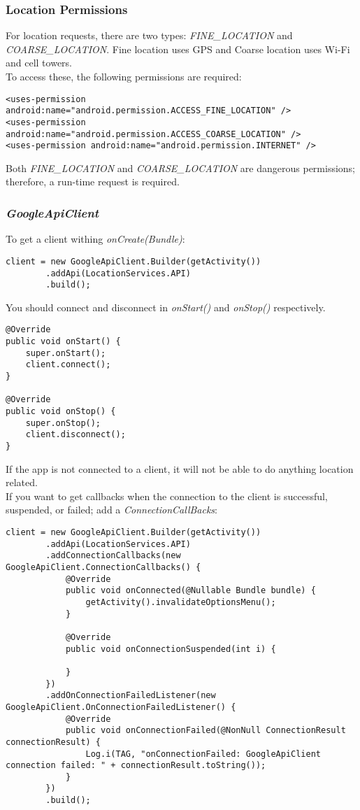 \documentclass[]{article}
\renewcommand{\it}[1]{\textit{#1}}
\begin{document}
\subsubsection{Location Permissions}
For location requests, there are two types: \it{FINE\_LOCATION} and \it{COARSE\_LOCATION}. 
Fine location uses GPS and Coarse location uses Wi-Fi and cell towers.
\\
To access these, the following permissions are required:
\begin{lstlisting}
<uses-permission android:name="android.permission.ACCESS_FINE_LOCATION" />
<uses-permission android:name="android.permission.ACCESS_COARSE_LOCATION" />
<uses-permission android:name="android.permission.INTERNET" />
\end{lstlisting}
Both \it{FINE\_LOCATION} and \it{COARSE\_LOCATION} are dangerous permissions; therefore, a run-time request is required.

\subsubsection{\it{GoogleApiClient}}
To get a client withing \it{onCreate(Bundle)}:
\begin{lstlisting}
client = new GoogleApiClient.Builder(getActivity())
		.addApi(LocationServices.API)
		.build();
\end{lstlisting}
You should connect and disconnect in \it{onStart()} and \it{onStop()} respectively.
\begin{lstlisting}
@Override
public void onStart() {
	super.onStart();
	client.connect();
}

@Override
public void onStop() {
	super.onStop();	
	client.disconnect();
}
\end{lstlisting}
If the app is not connected to a client, it will not be able to do anything location related.
\\
If you want to get callbacks when the connection to the client is successful, suspended, or failed; add a \it{ConnectionCallBacks}:
\begin{lstlisting}
client = new GoogleApiClient.Builder(getActivity())
		.addApi(LocationServices.API)
		.addConnectionCallbacks(new GoogleApiClient.ConnectionCallbacks() {
			@Override
			public void onConnected(@Nullable Bundle bundle) {
				getActivity().invalidateOptionsMenu();
			}
			
			@Override
			public void onConnectionSuspended(int i) {
				
			}
		})
		.addOnConnectionFailedListener(new GoogleApiClient.OnConnectionFailedListener() {
			@Override
			public void onConnectionFailed(@NonNull ConnectionResult connectionResult) {
				Log.i(TAG, "onConnectionFailed: GoogleApiClient connection failed: " + connectionResult.toString());
			}
		})
		.build();
\end{lstlisting}
\end{document}
